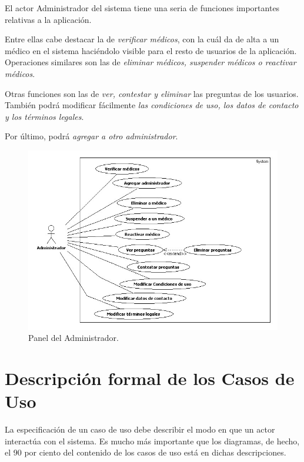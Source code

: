 				El actor Administrador del sistema tiene una seria de funciones importantes relativas a la aplicación. 

				Entre ellas cabe destacar la de \textit{verificar médicos}, con la cuál da de alta a un médico en el sistema haciéndolo visible para el resto de usuarios de la aplicación. Operaciones similares son las de \textit{eliminar médicos, suspender médicos o reactivar médicos}. 

				Otras funciones son las de \textit{ver, contestar y eliminar} las preguntas de los usuarios. También podrá modificar fácilmente \textit{las condiciones de uso, los datos de contacto y los términos legales}. 

				Por último, podrá \textit{agregar a otro administrador}.

				\begin{figure}[H]
				  \centering
				    \includegraphics[width=15cm]{img/jpg/casos_uso/Panel_de_Administrador.jpg}
				  \caption{Panel del Administrador.}
				  \label{fig:panel_admin}
				\end{figure}


		\newpage
		\section{Descripción formal de los Casos de Uso} %
		\label{sub:descripcion_formal_de_los_casos_de_uso}

			La especificación de un caso de uso debe describir el modo en que un actor interactúa con el sistema. Es mucho más importante que los diagramas, de hecho, el 90 por ciento del contenido de los casos de uso está en dichas descripciones.

